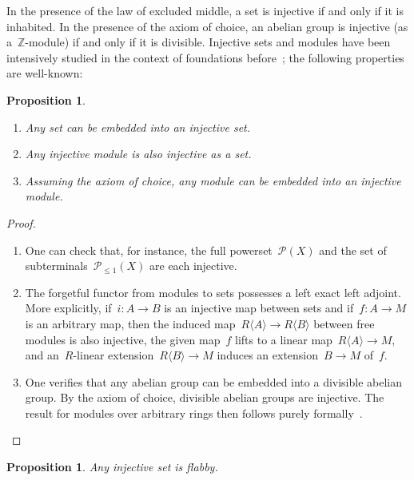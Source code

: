 \documentclass[oneside]{amsart}
\theoremstyle{definition}
\theoremstyle{plain}
\newtheorem{prop}[defn]{Proposition}
\theoremstyle{remark}
\newcommand{\ZZ}{\mathbb{Z}}
\renewcommand{\P}{\mathcal{P}}
\renewcommand{\_}{\mathpunct{.}\,}
\begin{document}
In the presence of the law of excluded middle, a set is injective if and only
if it is inhabited. In the presence of the axiom of choice, an abelian group is
injective (as a~$\ZZ$-module) if and only if it is divisible. Injective sets
and modules have been intensively studied in the context of foundations
before~\cite{blass:inj-proj-axc,harting:locally-injective,kenney:injective-choice,aczel-berg-granstroem-schuster:injective};
the following properties are well-known:

\begin{prop}\label{prop:basics-injective}
\begin{enumerate}
\item Any set can be embedded into an injective set.
\item Any injective module is also injective as a set.
\item Assuming the axiom of choice, any module can be embedded into an
injective module.
\end{enumerate}\end{prop}

\begin{proof}\begin{enumerate}
\item One can check that, for instance, the full powerset~$\P(X)$ and the set of
subterminals~$\P_{\leq 1}(X)$ are each injective.~\cite{XXX}
\item The forgetful functor from modules to sets possesses a left exact left
adjoint. More explicitly, if~$i : A \to B$ is an injective map between sets and
if~$f : A \to M$ is an arbitrary map, then the induced map~$R\langle A \rangle
\to R\langle B \rangle$ between free modules is also injective, the given
map~$f$ lifts to a linear map~$R\langle A \rangle \to M$, and an~$R$-linear
extension~$R\langle B \rangle \to M$ induces an extension~$B \to M$ of~$f$.
\item One verifies that any abelian group can be embedded into a divisible
abelian group. By the axiom of choice, divisible abelian groups are injective.
The result for modules over arbitrary rings then follows purely
formally~\cite{XXX}. \qedhere
\end{enumerate}\end{proof}

\begin{prop}\label{prop:injective-flabby}
Any injective set is flabby.\end{prop}
\end{document}
